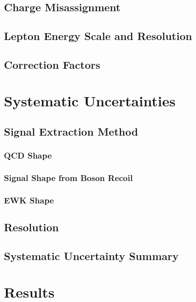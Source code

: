 \subsection{Charge Misassignment}
\subsection{Lepton Energy Scale and Resolution}
\subsection{Correction Factors}


\section{Systematic Uncertainties}
\subsection{Signal Extraction Method}
\subsubsection{QCD \ETm Shape}
\subsubsection{Signal \ETm Shape from Boson Recoil}
\subsubsection{EWK \ETm Shape}
\subsection{\ETm Resolution}
\subsection{Systematic Uncertainty Summary}

\section{Results}



